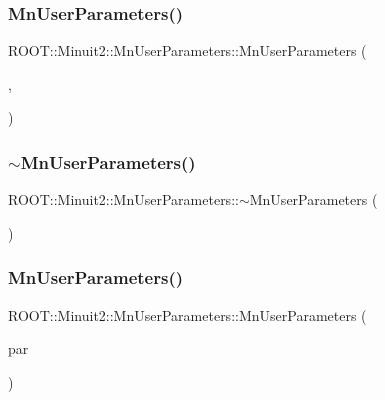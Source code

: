 \subsubsection{\texorpdfstring{MnUserParameters()}{MnUserParameters()}\hspace{0.1cm}{\footnotesize\ttfamily [5/6]}}
{\footnotesize\ttfamily R\+O\+O\+T\+::\+Minuit2\+::\+Mn\+User\+Parameters\+::\+Mn\+User\+Parameters (\begin{DoxyParamCaption}\item[{const std\+::vector$<$ double $>$ \&}]{,  }\item[{const std\+::vector$<$ double $>$ \&}]{ }\end{DoxyParamCaption})}

\mbox{\label{classROOT_1_1Minuit2_1_1MnUserParameters_a3b2d1f74827108c7dc34a5eb879dcc24}} 
\subsubsection{\texorpdfstring{$\sim$MnUserParameters()}{~MnUserParameters()}\hspace{0.1cm}{\footnotesize\ttfamily [2/2]}}
{\footnotesize\ttfamily R\+O\+O\+T\+::\+Minuit2\+::\+Mn\+User\+Parameters\+::$\sim$\+Mn\+User\+Parameters (\begin{DoxyParamCaption}{ }\end{DoxyParamCaption})\hspace{0.3cm}{\ttfamily [inline]}}

\mbox{\label{classROOT_1_1Minuit2_1_1MnUserParameters_aa4ba65a64a5dd051fecc3366c8e10617}} 
\subsubsection{\texorpdfstring{MnUserParameters()}{MnUserParameters()}\hspace{0.1cm}{\footnotesize\ttfamily [6/6]}}
{\footnotesize\ttfamily R\+O\+O\+T\+::\+Minuit2\+::\+Mn\+User\+Parameters\+::\+Mn\+User\+Parameters (\begin{DoxyParamCaption}\item[{const \mbox{\hyperlink{classROOT_1_1Minuit2_1_1MnUserParameters}{Mn\+User\+Parameters}} \&}]{par }\end{DoxyParamCaption})\hspace{0.3cm}{\ttfamily [inline]}}



